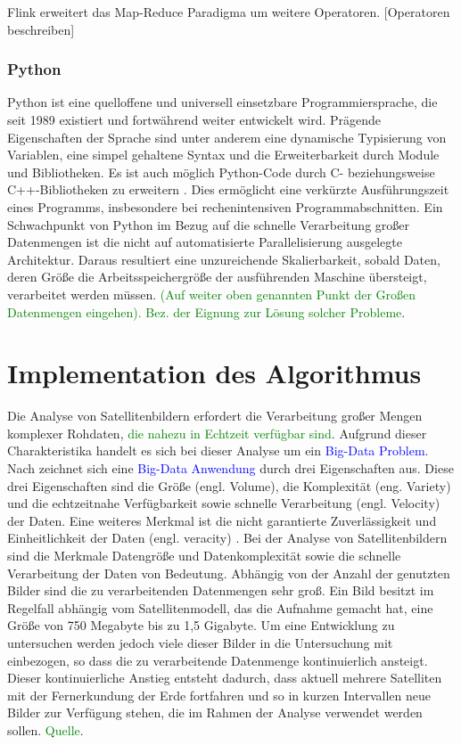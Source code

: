 Flink erweitert das Map-Reduce Paradigma um weitere Operatoren. [Operatoren beschreiben]
\subsection{Python}
Python ist eine quelloffene und universell einsetzbare Programmiersprache, die seit 1989 existiert und fortwährend weiter entwickelt wird. Prägende Eigenschaften der Sprache sind unter anderem eine dynamische Typisierung von Variablen, eine simpel gehaltene Syntax und die Erweiterbarkeit durch Module und Bibliotheken. Es ist auch möglich Python-Code durch C- beziehungsweise C++-Bibliotheken zu erweitern \cite{Martelli2006}. Dies ermöglicht eine verkürzte Ausführungszeit eines Programms, insbesondere bei rechenintensiven Programmabschnitten. Ein Schwachpunkt von Python im Bezug auf die schnelle Verarbeitung großer Datenmengen ist die nicht auf automatisierte Parallelisierung ausgelegte Architektur. Daraus resultiert eine unzureichende Skalierbarkeit, sobald Daten, deren Größe die Arbeitsspeichergröße der ausführenden Maschine übersteigt, verarbeitet werden müssen. \textcolor{green}{(Auf weiter oben genannten Punkt der Großen Datenmengen eingehen). Bez. der Eignung zur Lösung solcher Probleme}. 

\chapter{Implementation des Algorithmus}
Die Analyse von Satellitenbildern erfordert die Verarbeitung großer Mengen komplexer Rohdaten, \textcolor{green}{die nahezu in Echtzeit verfügbar sind}. Aufgrund dieser Charakteristika handelt es sich bei dieser Analyse um ein \textcolor{blue}{Big-Data Problem}. Nach \cite{Laney2001} zeichnet sich eine \textcolor{blue}{Big-Data Anwendung} durch drei Eigenschaften aus. Diese drei Eigenschaften sind die Größe (engl. Volume), die Komplexität (eng. Variety) und die echtzeitnahe Verfügbarkeit sowie schnelle Verarbeitung (engl. Velocity) der Daten. Eine weiteres Merkmal ist die nicht garantierte Zuverlässigkeit und Einheitlichkeit der Daten (engl. veracity) \cite{Zikopoulos2012}. 
\newline
Bei der Analyse von Satellitenbildern sind die Merkmale Datengröße und Datenkomplexität sowie die schnelle Verarbeitung der Daten von Bedeutung. Abhängig von der Anzahl der genutzten Bilder sind die zu verarbeitenden Datenmengen sehr groß. Ein Bild besitzt im Regelfall abhängig vom Satellitenmodell, das die Aufnahme gemacht hat, eine Größe von 750 Megabyte bis zu 1,5 Gigabyte. Um eine Entwicklung zu untersuchen werden jedoch viele dieser Bilder in die Untersuchung mit einbezogen, so dass die zu verarbeitende Datenmenge kontinuierlich ansteigt. Dieser kontinuierliche Anstieg entsteht dadurch, dass aktuell mehrere Satelliten mit der Fernerkundung der Erde fortfahren und so in kurzen Intervallen neue Bilder zur Verfügung stehen, die im Rahmen der Analyse verwendet werden sollen. \textcolor{green}{Quelle}.

